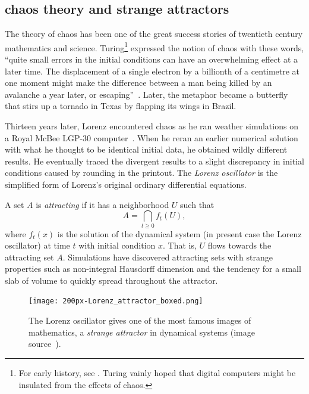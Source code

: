 \documentclass{llncs}
\begin{document}
\subsection{chaos theory and strange attractors}

The theory of chaos has been one of the great success stories of
twentieth century mathematics and science.   Turing\footnote{For
  early history, see \cite[p.~971]{Wolfram:NKS}. Turing vainly hoped that
  digital computers might be insulated from the effects of chaos.}
expressed the notion of chaos with these words, ``quite small errors
in the initial conditions can have an overwhelming effect at a later
time.  The displacement of a single electron by a billionth of a
centimetre at one moment might make the difference between a man being
killed by an avalanche a year later, or escaping''~\cite{Tu50}.
Later, the metaphor became a butterfly
that stirs up a tornado in Texas by flapping its wings in Brazil.

Thirteen years later, Lorenz encountered chaos as he ran weather
simulations on a Royal McBee LGP-30 computer~\cite{Lo63}.  When he
reran an earlier numerical solution with what he thought to be
identical initial data, he obtained wildly different results.  He
eventually traced the divergent results to a slight discrepancy in
initial conditions caused by rounding in the printout.  The {\it Lorenz
  oscillator} is the simplified form of Lorenz's original ordinary
differential equations.

A set $A$ is {\it attracting} if it has a neighborhood $U$ such
that
\[
A = \bigcap_{t\ge 0} f_t(U),
\]
where $f_t(x)$ is the solution of the dynamical system (in present
case the Lorenz oscillator) at time $t$ with initial condition
$x$. That is, $U$ flows towards the attracting set $A$.  Simulations
have discovered attracting sets with strange properties such as
non-integral Hausdorff dimension and the tendency for a small slab of 
volume to quickly spread throughout the attractor.


\begin{figure}[h!]
  \centering
\texttt{[image: 200px-Lorenz\_attractor\_boxed.png]}
  \caption{The Lorenz oscillator gives one of the
most famous images of mathematics, a {\it strange attractor} in
dynamical systems (image source~\cite{Lor11}).}
\label{fig:lorenz}
\end{figure}
\end{document}
